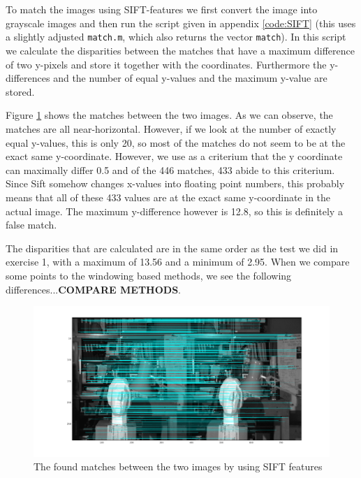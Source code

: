 \documentclass{article}
\begin{document}
\section{}


\section{}
To match the images using SIFT-features we first convert the image into grayscale images and then run the script given in appendix \ref{code:SIFT} (this uses a slightly adjusted \texttt{match.m}, which also returns the vector \texttt{match}). In this script we calculate the disparities between the matches that have a maximum difference of two y-pixels and store it together with the coordinates. Furthermore the y-differences and the number of equal y-values and the maximum y-value are stored.

Figure \ref{matches} shows the matches between the two images. As we can observe, the matches are all near-horizontal. However, if we look at the number of exactly equal y-values, this is only 20, so most of the matches do not seem to be at the exact same y-coordinate. However, we use as a criterium that the y coordinate can maximally differ 0.5 and of the 446 matches, 433 abide to this criterium. Since Sift somehow changes x-values into floating point numbers, this probably means that all of these 433 values are at the exact same y-coordinate in the actual image. The maximum y-difference however is 12.8, so this is definitely a false match.

The disparities that are calculated are in the same order as the test we did in exercise 1, with a maximum of 13.56 and a minimum of 2.95. When we compare some points to the windowing based methods, we see the following differences...\textbf{COMPARE METHODS}.

\begin{figure}
 \centering
 \includegraphics[width = \linewidth]{matches.png}
 \caption{The found matches between the two images by using SIFT features}
 \label{matches}
\end{figure}
\end{document}
